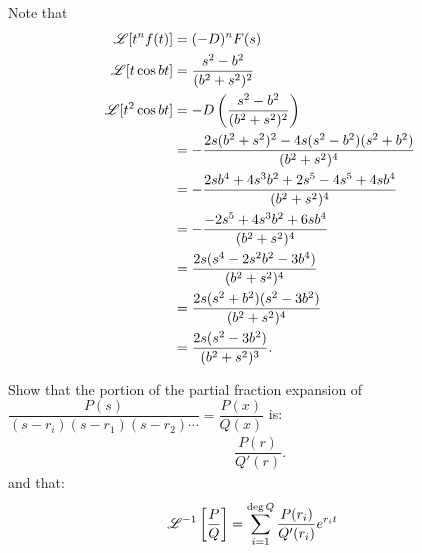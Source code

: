 \documentclass[11pt]{article}
\begin{document}
    \begin{solution}[Solution 2b] Note that 
        \begin{align}
            \mathscr L [t^n f(t)] &= (-D)^nF(s) \\
            \mathscr L [t \cos bt] &= \dfrac{s^2-b^2}{(b^2+s^2)^2} \\
            \mathscr L [t^2 \cos bt] &= -D \left(\dfrac{s^2-b^2}{(b^2+s^2)^2}\right) \\
            &= -\dfrac{2s(b^2+s^2)^2-4s(s^2-b^2)(s^2+b^2)}{(b^2 + s^2)^4} \\
            &= -\dfrac{2sb^4+4s^3b^2 +2s^5 - 4s^5 +4sb^4}{(b^2+s^2)^4} \\
            &= -\dfrac{-2s^5+4s^3b^2+6sb^4}{(b^2+s^2)^4} \\
            &= \dfrac{2s(s^4-2s^2b^2-3b^4)}{(b^2+s^2)^4} \\
            &= \dfrac{2s(s^2+b^2)(s^2-3b^2)}{(b^2+s^2)^4} \\
            &= \dfrac{2s(s^2-3b^2)}{(b^2+s^2)^3}.
        \end{align}
    \end{solution}
    \newpage
    \begin{problem}
        Show that the portion of the partial fraction expansion of \\ $\dfrac{P(s)}{(s-r_i)(s-r_1)(s-r_2) \cdots} = \dfrac{P(x)}{Q(x)}$ is:
        \begin{align}
            \dfrac{P(r)}{Q'(r)}.
        \end{align}
        and that:
        \begin{align}
            \mathscr L^{-1} \left[\dfrac{P}{Q}\right] &= \sum_{i=1}^{\deg Q} \dfrac{P(r_i)}{Q'(r_i)}e^{r_it}
        \end{align}
    \end{problem}
\end{document}
